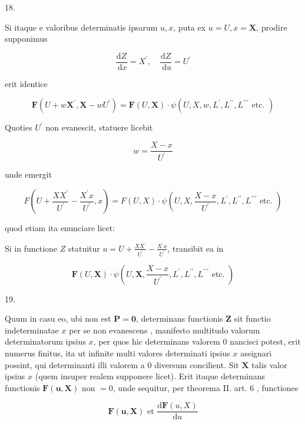 \documentclass[10pt]{article}
\begin{document}
18.

Si itaque e valoribus determinatis ipsarum \(u, x\), puta ex \(u=U, x=\mathbf{X}\), prodire supponimus

\[
\frac{\mathrm{d} Z}{\mathrm{~d} x}=X^{\prime}, \quad \frac{\mathrm{d} Z}{\mathrm{~d} u}=U^{\prime}
\]

erit identice

\[
\boldsymbol{F}\left(U+w \boldsymbol{X}^{\prime}, \boldsymbol{X}-w U^{\prime}\right)=\boldsymbol{F}(U, \boldsymbol{X}) \cdot \psi\left(U, X, w, L^{\prime}, L^{\prime \prime}, L^{\prime \prime \prime} \text { etc. }\right)
\]

Quoties \(U^{\prime}\) non evanescit, statuere licebit

\[
w=\frac{X-x}{U^{\prime}}
\]

unde emergit

\[
F\left(U+\frac{X X^{\prime}}{U^{\prime}}-\frac{X^{\prime} x}{U^{\prime}}, x\right)=F(U, X) \cdot \psi\left(U, X, \frac{X-x}{U^{\prime}}, L^{\prime}, L^{\prime \prime}, L^{\prime \prime \prime} \text { etc. }\right)
\]

quod etiam ita enunciare licet:

Si in functione \(Z\) statuitur \(u=U+\frac{X X^{\prime}}{U^{\prime}}-\frac{X^{\prime} x}{U^{\prime}}\), transibit ea in

\[
\boldsymbol{F}(U, \boldsymbol{X}) \cdot \psi\left(U, \boldsymbol{X}, \frac{X-x}{U^{\prime}}, L^{\prime}, L^{\prime \prime}, L^{\prime \prime \prime} \text { etc. }\right)
\]

19.

Quum in casu eo, ubi non est \(\boldsymbol{P}=\mathbf{0}\), determinans functionis \(\boldsymbol{Z}\) sit functio indeterminatae \(x\) per se non evanescens , manifesto multitudo valorum determinatorum ipsius \(x\), per quos hic determinans valorem 0 nancisci potest, erit numerus finitus, ita ut infinite multi valores determinati ipsius \(x\) assignari possint, qui determinanti illi valorem a 0 diversum concilient. Sit \(\boldsymbol{X}\) talis valor ipsius \(x\) (quem insuper realem supponere licet). Erit itaque determinans functionis \(\boldsymbol{F}(\boldsymbol{u}, \boldsymbol{X})\) non \(=0\), unde sequitur, per theorema II. art. 6 , functiones

\[
\boldsymbol{F}(\boldsymbol{u}, \boldsymbol{X}) \text { et } \frac{\mathrm{d} \boldsymbol{F}(u, X)}{\mathrm{d} u}
\]
\end{document}
